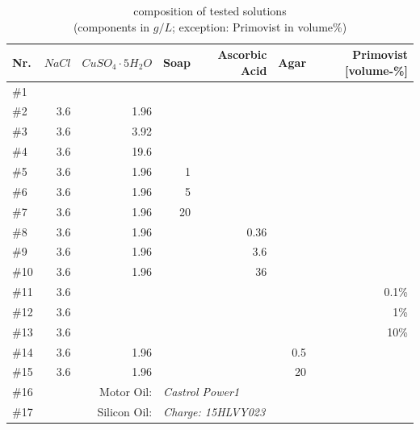 \documentclass[parskip,bibtotoc,final,twoside=false,titlepage,a4paper,english,12pt,titlepage,a4paper]{scrbook}
\begin{document}
\begin{table}[!hbt]
\centering
\begin{tabular}{@{}l|rrrrrr@{}}
Nr.   & $NaCl$   & $CuSO_4\cdot5H_2O$          & Soap & Ascorbic Acid & Agar & Primovist [volume-\%]\\
\toprule
\#1  &             &                   &      &               &           &		\\
\#2  & 3.6         & 1.96              &      &               &           &		\\
\#3  & 3.6         & 3.92              &      &               &           &		\\
\#4  & 3.6         & 19.6              &      &               &           &		\\
\#5  & 3.6         & 1.96              & 1    &               &           &		\\
\#6  & 3.6         & 1.96              & 5    &               &           &		\\
\#7  & 3.6         & 1.96              & 20   &               &           &		\\
\#8  & 3.6         & 1.96              &      & 0.36          &           &		\\
\#9  & 3.6         & 1.96              &      & 3.6           &           &		\\
\#10 & 3.6         & 1.96              &      & 36            &           &		\\
\#11 & 3.6         &                   &      &               &           & 0.1\%	\\
\#12 & 3.6         &                   &      &               &           & 1\%		\\
\#13 & 3.6         &                   &      &               &           & 10\%	\\
\#14 & 3.6         & 1.96              &      &               &  0.5      &		\\
\#15 & 3.6         & 1.96              &      &               &   20      &		\\
\midrule
\#16 & \multicolumn{2}{r}{Motor Oil:}   & \multicolumn{4}{l}{\textit{Castrol Power1}}      \\
\#17 & \multicolumn{2}{r}{Silicon Oil:} & \multicolumn{4}{l}{\textit{Charge: 15HLVY023}}   \\ \bottomrule
\end{tabular}
\caption{composition of tested solutions\\(components in $g/L$; exception: Primovist in volume\%)}
\label{tab:solutions}
\end{table}
\end{document}
